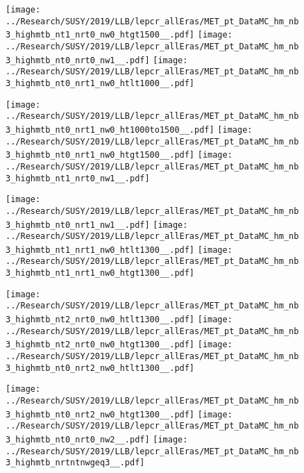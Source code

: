 \begin{figure}[!htb]
  \texttt{[image: ../Research/SUSY/2019/LLB/lepcr\_allEras/MET\_pt\_DataMC\_hm\_nb3\_highmtb\_nt1\_nrt0\_nw0\_htgt1500\_\_.pdf]}
\endminipage\hfill
{}
  \texttt{[image: ../Research/SUSY/2019/LLB/lepcr\_allEras/MET\_pt\_DataMC\_hm\_nb3\_highmtb\_nt0\_nrt0\_nw1\_\_.pdf]}
\endminipage\hfill
{}
  \texttt{[image: ../Research/SUSY/2019/LLB/lepcr\_allEras/MET\_pt\_DataMC\_hm\_nb3\_highmtb\_nt0\_nrt1\_nw0\_htlt1000\_\_.pdf]}
\endminipage
\end{figure}

\begin{figure}[!htb]
  \texttt{[image: ../Research/SUSY/2019/LLB/lepcr\_allEras/MET\_pt\_DataMC\_hm\_nb3\_highmtb\_nt0\_nrt1\_nw0\_ht1000to1500\_\_.pdf]}
\endminipage\hfill
{}
  \texttt{[image: ../Research/SUSY/2019/LLB/lepcr\_allEras/MET\_pt\_DataMC\_hm\_nb3\_highmtb\_nt0\_nrt1\_nw0\_htgt1500\_\_.pdf]}
\endminipage\hfill
{}
  \texttt{[image: ../Research/SUSY/2019/LLB/lepcr\_allEras/MET\_pt\_DataMC\_hm\_nb3\_highmtb\_nt1\_nrt0\_nw1\_\_.pdf]}
\endminipage
\end{figure}

\begin{figure}[!htb]
  \texttt{[image: ../Research/SUSY/2019/LLB/lepcr\_allEras/MET\_pt\_DataMC\_hm\_nb3\_highmtb\_nt0\_nrt1\_nw1\_\_.pdf]}
\endminipage\hfill
{}
  \texttt{[image: ../Research/SUSY/2019/LLB/lepcr\_allEras/MET\_pt\_DataMC\_hm\_nb3\_highmtb\_nt1\_nrt1\_nw0\_htlt1300\_\_.pdf]}
\endminipage\hfill
{}
  \texttt{[image: ../Research/SUSY/2019/LLB/lepcr\_allEras/MET\_pt\_DataMC\_hm\_nb3\_highmtb\_nt1\_nrt1\_nw0\_htgt1300\_\_.pdf]}
\endminipage
\end{figure}

\begin{figure}[!htb]
  \texttt{[image: ../Research/SUSY/2019/LLB/lepcr\_allEras/MET\_pt\_DataMC\_hm\_nb3\_highmtb\_nt2\_nrt0\_nw0\_htlt1300\_\_.pdf]}
\endminipage\hfill
{}
  \texttt{[image: ../Research/SUSY/2019/LLB/lepcr\_allEras/MET\_pt\_DataMC\_hm\_nb3\_highmtb\_nt2\_nrt0\_nw0\_htgt1300\_\_.pdf]}
\endminipage\hfill
{}
  \texttt{[image: ../Research/SUSY/2019/LLB/lepcr\_allEras/MET\_pt\_DataMC\_hm\_nb3\_highmtb\_nt0\_nrt2\_nw0\_htlt1300\_\_.pdf]}
\endminipage
\end{figure}

\begin{figure}[!htb]
  \texttt{[image: ../Research/SUSY/2019/LLB/lepcr\_allEras/MET\_pt\_DataMC\_hm\_nb3\_highmtb\_nt0\_nrt2\_nw0\_htgt1300\_\_.pdf]}
\endminipage\hfill
{}
  \texttt{[image: ../Research/SUSY/2019/LLB/lepcr\_allEras/MET\_pt\_DataMC\_hm\_nb3\_highmtb\_nt0\_nrt0\_nw2\_\_.pdf]}
\endminipage\hfill
{}
  \texttt{[image: ../Research/SUSY/2019/LLB/lepcr\_allEras/MET\_pt\_DataMC\_hm\_nb3\_highmtb\_nrtntnwgeq3\_\_.pdf]}
\endminipage
\end{figure}
